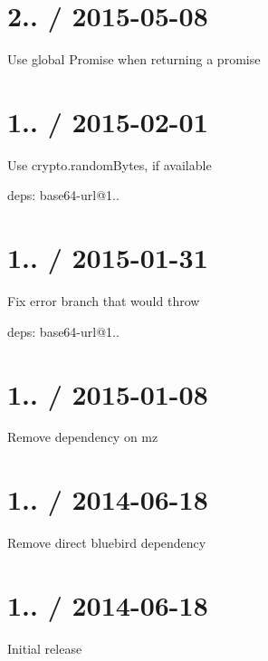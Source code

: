 \section*{2.. / 2015-\/05-\/08 }


\begin{DoxyItemize}
\item Use global {\ttfamily Promise} when returning a promise
\end{DoxyItemize}

\section*{1.. / 2015-\/02-\/01 }


\begin{DoxyItemize}
\item Use {\ttfamily crypto.\+random\+Bytes}, if available
\item deps\+: base64-\/url@1..
\end{DoxyItemize}

\section*{1.. / 2015-\/01-\/31 }


\begin{DoxyItemize}
\item Fix error branch that would throw
\item deps\+: base64-\/url@1..
\end{DoxyItemize}

\section*{1.. / 2015-\/01-\/08 }


\begin{DoxyItemize}
\item Remove dependency on {\ttfamily mz}
\end{DoxyItemize}

\section*{1.. / 2014-\/06-\/18 }


\begin{DoxyItemize}
\item Remove direct {\ttfamily bluebird} dependency
\end{DoxyItemize}

\section*{1.. / 2014-\/06-\/18 }


\begin{DoxyItemize}
\item Initial release 
\end{DoxyItemize}